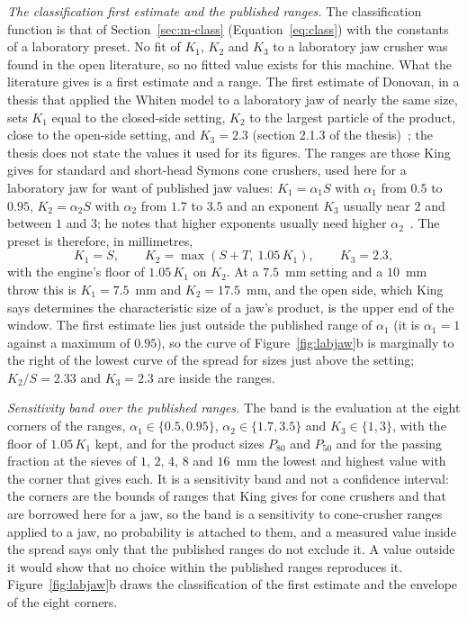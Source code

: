 \emph{The classification first estimate and the published ranges.} The classification function is that of Section~\ref{sec:m-class} (Equation~\eqref{eq:class}) with the constants of a laboratory preset. No fit of $K_1$, $K_2$ and $K_3$ to a laboratory jaw crusher was found in the open literature, so no fitted value exists for this machine. What the literature gives is a first estimate and a range. The first estimate of Donovan, in a thesis that applied the Whiten model to a laboratory jaw of nearly the same size, sets $K_1$ equal to the closed-side setting, $K_2$ to the largest particle of the product, close to the
open-side setting, and $K_3=2.3$ (section 2.1.3 of the thesis)~\cite{donovan2003}; the thesis does not state the values it used for its figures. The ranges are those King gives for standard and short-head Symons cone crushers, used here for a laboratory jaw for want of published jaw values: $K_1=\alpha_1S$ with $\alpha_1$ from $0.5$ to $0.95$, $K_2=\alpha_2S$ with $\alpha_2$ from $1.7$ to $3.5$ and an exponent $K_3$ usually near $2$ and between $1$ and $3$; he notes that higher exponents usually need higher $\alpha_2$~\cite{king2000}. The preset is therefore, in millimetres,
\begin{equation}
K_1=S,\qquad K_2=\max\left(S+T,\ 1.05\,K_1\right),\qquad K_3=2.3,
\label{eq:labjaw-first}
\end{equation}
with the engine's floor of $1.05\,K_1$ on $K_2$. At a $7.5$~mm setting and a $10$~mm throw this is $K_1=7.5$~mm and $K_2=17.5$~mm, and the open side, which King says determines the characteristic size of a jaw's product, is the upper end of the window. The first estimate lies just outside the published range of $\alpha_1$ (it is $\alpha_1=1$ against a maximum of $0.95$), so the curve of Figure~\ref{fig:labjaw}b is marginally to the right of the lowest curve of the spread for sizes just above the setting; $K_2/S=2.33$ and $K_3=2.3$ are inside the ranges.

\emph{Sensitivity band over the published ranges.} The band is the evaluation at the eight corners of the ranges, $\alpha_1\in\{0.5,0.95\}$, $\alpha_2\in\{1.7,3.5\}$ and $K_3\in\{1,3\}$, with the floor of $1.05\,K_1$ kept, and for the product sizes $P_{80}$ and $P_{50}$ and for the passing fraction at the sieves of $1$, $2$, $4$, $8$ and $16$~mm the lowest and highest value with the corner that gives each. It is a sensitivity band and not a confidence interval: the corners are the bounds of ranges that King gives for cone crushers and that are borrowed here for a jaw, so the band is a sensitivity to cone-crusher ranges applied to a jaw, no probability is attached to them, and a measured value inside the spread says
only that the published ranges do not exclude it. A value outside it would show that no choice within the published ranges reproduces it. Figure~\ref{fig:labjaw}b draws the classification of the first estimate and the envelope of the eight corners.

